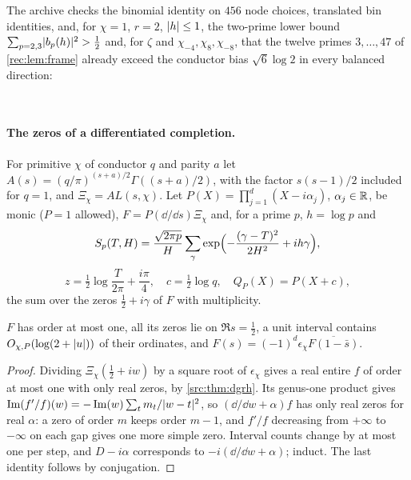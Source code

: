 The archive checks the binomial identity on $456$ node choices, translated bin identities, and,
for $\chi=1$, $r=2$, $\lvert h\rvert\le1$, the two-prime lower bound $\sum_{p=2,3}\lvert b_p(h)\rvert^2>\tfrac12$
and, for $\zeta$ and $\chi_{-4},\chi_8,\chi_{-8}$, that the twelve primes $3,\dots,47$ of \cref{rec:lem:frame} already
exceed the conductor bias $\sqrt6\log2$ in every balanced direction:
\begin{center}
\\
\end{center}

\paragraph{The zeros of a differentiated completion.}
For primitive $\chi$ of conductor $q$ and parity $a$ let $A(s)=(q/\pi)^{(s+a)/2}\Gamma((s+a)/2)$, with
the factor $s(s-1)/2$ included for $q=1$, and $\Xi_\chi=AL(s,\chi)$. Let $P(X)=\prod_{j=1}^d(X-i\alpha_j)$,
$\alpha_j\in\mathbb{R}$, be monic ($P=1$ allowed), $F=P(\dd/\dd s)\Xi_\chi$ and, for a prime $p$, $h=\log p$ and
\[
 S_p(T,H)=\frac{\sqrt{2\pi p}}H\sum_\gamma\exp\Bigl(-\frac{(\gamma-T)^2}{2H^2}+ih\gamma\Bigr),\]\[
 z=\tfrac12\log\frac T{2\pi}+\frac{i\pi}4,\quad c=\tfrac12\log q,\quad Q_P(X)=P(X+c),
\]
the sum over the zeros $\tfrac12+i\gamma$ of $F$ with multiplicity.

\begin{lemma}\label{rec:lem:interlace}
$F$ has order at most one, all its zeros lie on $\Re s=\tfrac12$, a unit interval contains
$O_{\chi,P}(\log(2+\lvert u\rvert))$ of their ordinates, and $F(s)=(-1)^d\epsilon_\chi\overline{F(1-\bar s)}$.
\end{lemma}

\begin{proof}
Dividing $\Xi_\chi(\tfrac12+iw)$ by a square root of $\epsilon_\chi$ gives a real entire $f$ of order at most
one with only real zeros, by \cref{src:thm:dgrh}. Its genus-one product gives
$\operatorname{Im}(f'/f)(w)=-\operatorname{Im}(w)\sum_tm_t/\lvert w-t\rvert^2$, so $(\dd/\dd w+\alpha)f$ has only real zeros for real $\alpha$: a zero of
order $m$ keeps order $m-1$, and $f'/f$ decreasing from $+\infty$ to $-\infty$ on each gap gives one more
simple zero. Interval counts change by at most one per step, and $D-i\alpha$ corresponds to
$-i(\dd/\dd w+\alpha)$; induct. The last identity follows by conjugation.
\end{proof}

